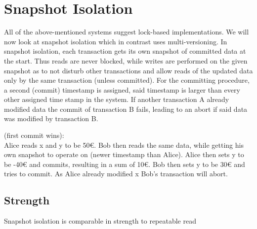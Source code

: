 \documentclass[sigconf, review=true]{acmart}
\begin{document}
\section{Snapshot Isolation}
All of the above-mentioned systems suggest lock-based implementations. We will now look at
snapshot isolation which in contrast uses multi-versioning.
In snapshot isolation, each transaction gets its own snapshot of committed data at the start.
Thus reads are never blocked, while writes are performed on the given snapshot as to not disturb
other transactions and allow reads of the updated data only by the same transaction (unless committed).
For the committing procedure, a second (commit) timestamp is assigned, said timestamp is larger than every
other assigned time stamp in the system. If another transaction A already modified data the commit of
transaction B fails, leading to an abort if said data was modified by transaction B.
\begin{example}
    (first commit wins): \\
    Alice reads x and y to be 50€. Bob then reads the same data, while getting his own snapshot
    to operate on (newer timestamp than Alice). Alice then sets y to be -40€ and commits,
    resulting in a sum of 10€. Bob then sets y to be 30€ and tries to commit. As Alice already
    modified x Bob’s transaction will abort.
\end{example}
\subsection{Strength}
Snapshot isolation is comparable in strength to repeatable read
\end{document}
